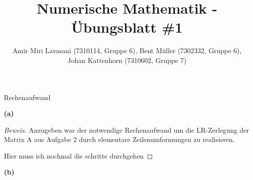 \documentclass[10pt]{article}
\newenvironment{Aufgabe}[2][Aufgabe]{\begin{trivlist}
\item[\hskip \labelsep {\bfseries #1}\hskip \labelsep {\bfseries #2.}]}{\end{trivlist}}
\begin{document}
 
\title{ \textbf{Numerische Mathematik - Übungsblatt \#1} }

\author{Amir Miri Lavasani (7310114, Gruppe 6), Bent Müller (7302332, Gruppe 6), \\ 
Johan Kattenhorn (7310602, Gruppe 7)} \maketitle

 
\begin{Aufgabe}{3}
	Rechenaufwand
\end{Aufgabe}

\textbf{(a)}

\begin{proof}[Beweis]
	Anzugeben war der notwendige Rechenaufwand um die LR-Zerlegung der Matrix A 
	aus Aufgabe 2 durch elementare Zeilenumformungen zu realisieren.

	Hier muss ich nochmal die schritte durchgehen
\end{proof}

\textbf{(b)}
\end{document}
